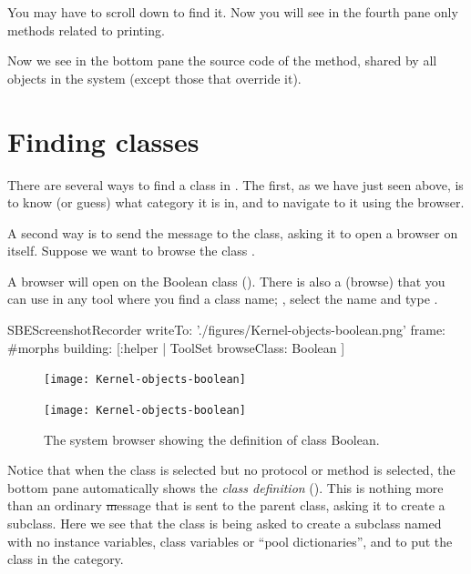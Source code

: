\documentclass[a4paper,10pt,twoside]{book}
\begin{document}
You may have to scroll down to find it.
Now you will see in the fourth pane only methods related to printing.

Now we see in the bottom pane the source code of the  method, shared by all objects in the system (except those that override it).

\section{Finding classes}

There are several ways to find a class in \sq.
The first, as we have just seen above, is to know (or guess) what category it is in, and to navigate to it using the browser.

A second way is to send the  message to the class, asking it to open a browser on itself.
Suppose we want to browse the class .

A browser will open on the Boolean class ().
There is also a   (browse) that you can use in any tool where you find a class name; , select the name and type .


\begin{ExecuteSmalltalkScript}
SBEScreenshotRecorder writeTo: './figures/Kernel-objects-boolean.png' frame: #morphs building: [:helper |
	ToolSet browseClass:  Boolean
]
\end{ExecuteSmalltalkScript}
\begin{figure}[hbt]
\ifluluelse
	{\centerline {\texttt{[image: Kernel-objects-boolean]}}}
	{\centerline {\texttt{[image: Kernel-objects-boolean]}}}
\caption{The system browser showing the definition of class Boolean.
\label{fig:browseBoolean}}
\end{figure}

Notice that when the  class is selected but no protocol or method is selected, the bottom pane automatically shows the \emph{class definition}
().
This is nothing more than an ordinary \st message that is sent to the parent class, asking it to create a subclass.
Here we see that the class  is being asked to create a subclass named  with no instance variables, class variables or ``pool dictionaries'', and to put the class  in the  category.
\end{document}
